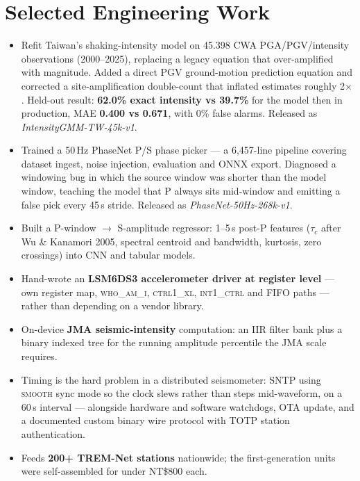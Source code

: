 \documentclass[10pt,a4paper]{article}
\begin{document}
\section{Selected Engineering Work}

\begin{itemize}
  \item Refit Taiwan's shaking-intensity model on \num{45,398} CWA PGA/PGV/intensity observations (2000–2025),
        replacing a legacy equation that over-amplified with magnitude. Added a direct PGV ground-motion prediction
        equation and corrected a site-amplification double-count that inflated estimates roughly 2$\times$.
        Held-out result: \textbf{62.0\% exact intensity vs 39.7\%} for the model then in production,
        MAE \textbf{0.400 vs 0.671}, with 0\% false alarms. Released as \textit{IntensityGMM-TW-45k-v1}.
  \item Trained a 50\,Hz PhaseNet P/S phase picker — a 6,457-line pipeline covering dataset ingest, noise injection,
        evaluation and ONNX export. Diagnosed a windowing bug in which the source window was shorter than the model
        window, teaching the model that P always sits mid-window and emitting a false pick every 45\,s stride.
        Released as \textit{PhaseNet-50Hz-268k-v1}.
  \item Built a P-window $\rightarrow$ S-amplitude regressor: 1–5\,s post-P features ($\tau_c$ after
        Wu \& Kanamori 2005, spectral centroid and bandwidth, kurtosis, zero crossings) into CNN and tabular models.
\end{itemize}

\begin{itemize}
  \item Hand-wrote an \textbf{LSM6DS3 accelerometer driver at register level} — own register map, \textsc{who\_am\_i},
        \textsc{ctrl1\_xl}, \textsc{int1\_ctrl} and FIFO paths — rather than depending on a vendor library.
  \item On-device \textbf{JMA seismic-intensity} computation: an IIR filter bank plus a binary indexed tree for the
        running amplitude percentile the JMA scale requires.
  \item Timing is the hard problem in a distributed seismometer: SNTP using \textsc{smooth} sync mode so the clock
        slews rather than steps mid-waveform, on a 60\,s interval — alongside hardware and software watchdogs,
        OTA update, and a documented custom binary wire protocol with TOTP station authentication.
  \item Feeds \textbf{200+ TREM-Net stations} nationwide; the first-generation units were self-assembled for under
        NT\$800 each.
\end{itemize}
\end{document}
